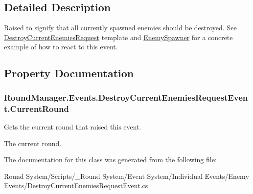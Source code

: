 \subsection{Detailed Description}
Raised to signify that all currently spawned enemies should be destroyed. See \hyperlink{class_round_manager_1_1_destroy_current_enemies_request}{Destroy\+Current\+Enemies\+Request} template and \hyperlink{class_round_manager_1_1_enemy_spawner}{Enemy\+Spawner} for a concrete example of how to react to this event. 



\subsection{Property Documentation}
\hypertarget{class_round_manager_1_1_events_1_1_destroy_current_enemies_request_event_a0ecf1401856fc8cf0ed4763d08816149}{}
\subsubsection[{Current\+Round}]{ Round\+Manager.\+Events.\+Destroy\+Current\+Enemies\+Request\+Event.\+Current\+Round\hspace{0.3cm}{\ttfamily [get]}}\label{class_round_manager_1_1_events_1_1_destroy_current_enemies_request_event_a0ecf1401856fc8cf0ed4763d08816149}


Gets the current round that raised this event. 

The current round.

The documentation for this class was generated from the following file\+:\begin{DoxyCompactItemize}
\item 
Round System/\+Scripts/\+\_\+\+Round System/\+Event System/\+Individual Events/\+Enemy Events/Destroy\+Current\+Enemies\+Request\+Event.\+cs\end{DoxyCompactItemize}
